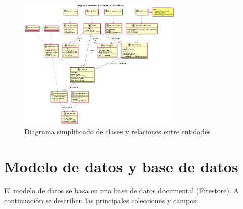 \documentclass[twoside, openright, 11pt]{report}
\begin{document}
\begin{figure}[H]
  \centering
  \includegraphics[width=0.7\textwidth]{imagenes/class_diagram.png}
  \caption{Diagrama simplificado de clases y relaciones entre entidades}
  \label{fig:class_diagram}
\end{figure}

\section{Modelo de datos y base de datos}
El modelo de datos se basa en una base de datos documental (Firestore). A continuación se describen las principales colecciones y campos:
\end{document}
